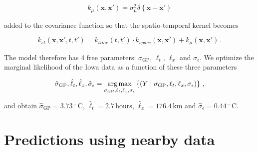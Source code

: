 \documentclass[letter]{article}
\newcommand{\genericdel}[3]{%
      \left#1#3\right#2
    }
\newcommand{\del}[1]{\genericdel(){#1}}
\newcommand{\cbr}[1]{\genericdel\{\}{#1}}
\DeclareMathOperator*{\argmax}{arg\,max}
\let\Pr\relax
\DeclareMathOperator{\Pr}{\mathbb{P}}
\newcommand{\xvec}{\mathbold{x}}
\newcommand{\sigmaf}{\sigma_{\mathrm{GP}}}
\newcommand{\sigman}{\sigma_{\epsilon}}
\newcommand{\degreeC}{{}^{\circ}~\mathrm{C}}
\begin{document}
\begin{equation}
    k_{\mu}(\xvec, \xvec') = \sigma_\mu^2 \delta\cbr{\xvec-\xvec'}
\end{equation}

added to the covariance function so that the spatio-temporal kernel becomes

\begin{equation}
    k_{st}(\xvec,\xvec',t,t') = k_{time}(t,t') \cdot k_{space}(\xvec, \xvec') + k_\mu(\xvec, \xvec') \,.
\end{equation}

The model therefore has 4 free parameters: \(\sigmaf\), \(\ell_t\), \(\ell_x\) and \(\sigman\).
We optimize the marginal likelihood of the Iowa data as a function of these three parameters

\begin{equation}
\label{eq:optimization}
\hat\sigmaf,\hat\ell_t,\hat\ell_x,\hat\sigman = \argmax_{\sigmaf,\ell_t,\ell_x,\sigman} \cbr{ \Pr\del{ Y \mid {\sigmaf,\ell_t,\ell_x,\sigman} } }\,,
\end{equation}

and obtain \(\hat\sigmaf=3.73\,\degreeC\), \(\hat\ell_t=2.7\,\mathrm{hours}\), \(\hat\ell_x=176.4\,\mathrm{km}\) and \(\hat\sigman=0.44\,\degreeC\).
    


        \section{Predictions using nearby data}\label{predictions-using-nearby-data}
    
\end{document}
